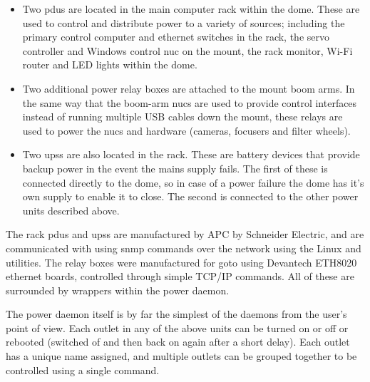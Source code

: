 \begin{colsection}
\begin{colsection}
\begin{itemize}
    \item Two \glspl{pdu} are located in the main computer rack within the dome. These are used to control and distribute power to a variety of sources; including the primary control computer and ethernet switches in the rack, the servo controller and Windows control \gls{nuc} on the mount, the rack monitor, Wi-Fi router and LED lights within the dome.
    \item Two additional power relay boxes are attached to the mount boom arms. In the same way that the boom-arm \glspl{nuc} are used to provide control interfaces instead of running multiple USB cables down the mount, these relays are used to power the \glspl{nuc} and hardware (cameras, focusers and filter wheels).
    \item Two \glspl{ups} are also located in the rack. These are battery devices that provide backup power in the event the mains supply fails. The first of these is connected directly to the dome, so in case of a power failure the dome has it's own supply to enable it to close. The second is connected to the other power units described above.
\end{itemize}

The rack \glspl{pdu} and \glspl{ups} are manufactured by APC by Schneider Electric, and are communicated with using \gls{snmp} commands over the network using the Linux  and  utilities. The relay boxes were manufactured for \gls{goto} using Devantech ETH8020 ethernet boards, controlled through simple TCP/IP commands. All of these are surrounded by  wrappers within the power daemon.

The power daemon itself is by far the simplest of the daemons from the user's point of view. Each outlet in any of the above units can be turned on or off or rebooted (switched of and then back on again after a short delay). Each outlet has a unique name assigned, and multiple outlets can be grouped together to be controlled using a single command.

\end{colsection}


\end{colsection}


\newpage
